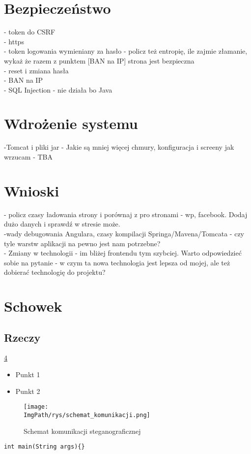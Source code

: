 \documentclass[a4paper,12pt,twoside,openany]{report}
\newcommand{\ImgPath}{.}
\begin{document}
\chapter{Bezpieczeństwo}
\label{Safety}
- token do CSRF\\
- https\\
- token logowania wymieniany za hasło - policz też entropię, ile zajmie złamanie, wykaż że razem z punktem [BAN na IP] strona jest bezpieczna\\
- reset i zmiana hasła\\
- BAN na IP\\
- SQL Injection - nie działa bo Java\\

\chapter{Wdrożenie systemu}
-Tomcat i pliki jar
- Jakie są mniej więcej chmury, konfiguracja i screeny jak wrzucam - TBA
\chapter{Wnioski}
- policz czasy ładowania strony i porównaj z pro stronami - wp, facebook. Dodaj dużo danych i sprawdź w stresie może.\\
-wady debugowania Angulara, czasy kompilacji Springa/Mavena/Tomcata - czy tyle warstw aplikacji na pewno jest nam potrzebne?\\
- Zmiany w technologii - im bliżej frontendu tym szybciej. Warto odpowiedzieć sobie na pytanie - w czym ta nowa technologia jest lepsza od mojej, ale też dobierać technologię do projektu?


\chapter{Schowek}
\label{Schowek}

\section{Rzeczy}
\ref{Schowek}
\cite{Stevens}
\begin{itemize}
	\item Punkt 1
	\item Punkt 2
\end{itemize}
\begin{figure}[!htbp]
	\begin{center}
		\centering
		\texttt{[image: \\ImgPath/rys/schemat\_komunikacji.png]}
	\end{center}
	\caption{Schemat komunikacji steganograficznej}
	\label{schematKomunikacji}
\end{figure}
\begin{lstlisting}
int main(String args){}
\end{lstlisting}
\end{document}
